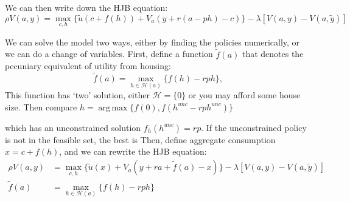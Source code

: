 \documentclass[12pt]{article}
\DeclareMathOperator*{\argmax}{arg\,max}
\DeclareMathOperator{\1}{\mathbbm{1}}
\begin{document}
We can then write down the HJB equation:
\begin{equation}
\rho V(a,y) = \max_{c,h} \big \{ \tilde u (c + f(h)) + V_a (y + r(a-ph) - c)\big \} - \lambda [V(a,y) - V(a,\tilde y)] 
\end{equation}

We can solve the model two ways, either by finding the policies numerically, or we can do a change of variables. First, define a function $\tilde f(a)$ that denotes the pecuniary equivalent of utility from housing:
\begin{equation}
\tilde f (a) = \max_{h\in \mathcal{H}(a)} \big \{ f(h) - rph \},
\end{equation}
This function has `two' solution, either $\mathcal{H}=\{0\}$ or you may afford some house size. Then compare $h=\argmax\{f(0), f(h^{unc} - rph^{unc})\}$

which has an unconstrained solution $f_h(h^{unc})=rp$. If the unconstrained policy is not in the feasible set, the best is Then, define aggregate consumption $x=c+f(h)$, and we can rewrite the HJB equation:
\begin{align*}
\rho V(a,y) &= \max_{c,h} \big \{ \tilde u (x) + V_a (y + ra + \tilde f(a) - x)  \big \} - \lambda [V(a,y) - V(a,\tilde y)] \\
\tilde f (a) &= \max_{h\in \mathcal{H}(a)} \big \{ f(h) - rph \}
\end{align*}
\end{document}
